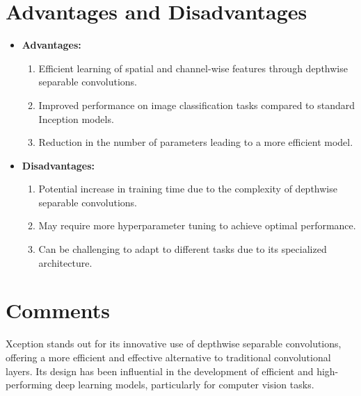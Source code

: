\section{Advantages and Disadvantages}
\begin{itemize}
    \item \textbf{Advantages:}
    \begin{enumerate}
        \item Efficient learning of spatial and channel-wise features through depthwise separable convolutions.
        \item Improved performance on image classification tasks compared to standard Inception models.
        \item Reduction in the number of parameters leading to a more efficient model.
    \end{enumerate}
    \item \textbf{Disadvantages:}
    \begin{enumerate}
        \item Potential increase in training time due to the complexity of depthwise separable convolutions.
        \item May require more hyperparameter tuning to achieve optimal performance.
        \item Can be challenging to adapt to different tasks due to its specialized architecture.
    \end{enumerate}
\end{itemize}

\section{Comments}
Xception stands out for its innovative use of depthwise separable convolutions, offering a more efficient and effective alternative to traditional convolutional layers. Its design has been influential in the development of efficient and high-performing deep learning models, particularly for computer vision tasks.
